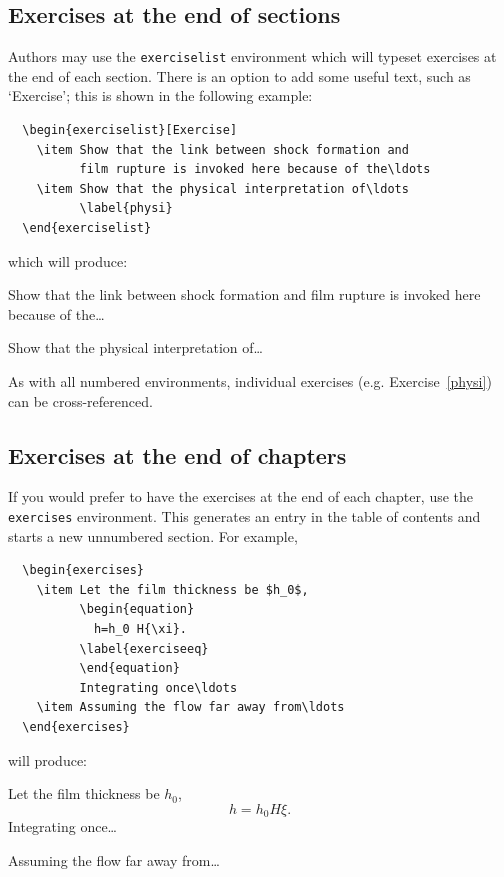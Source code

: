 \subsection{Exercises at the end of sections}
\label{exendofsections}

Authors may use the \verb"exerciselist" environment which will typeset exercises at the end of each section. There is an option to add some useful text, such as `Exercise'; this is shown in the following example:
\begin{verbatim}
  \begin{exerciselist}[Exercise]
    \item Show that the link between shock formation and
          film rupture is invoked here because of the\ldots
    \item Show that the physical interpretation of\ldots
          \label{physi}
  \end{exerciselist}
\end{verbatim}
which will produce:
  \begin{exerciselist}[Exercise]
    \item Show that the link between shock formation and
          film rupture is invoked here because of the\ldots
    \item Show that the physical interpretation of\ldots
          \label{physi}
  \end{exerciselist}
As with all numbered environments, individual exercises (e.g. Exercise~\ref{physi}) can be cross-referenced.

\subsection{Exercises at the end of chapters}

If you would prefer to have the exercises at the end of each chapter, use the \verb"exercises" environment. This generates an entry in the table of contents and starts a new unnumbered section. For example,
\begin{verbatim}
  \begin{exercises}
    \item Let the film thickness be $h_0$,
          \begin{equation}
            h=h_0 H{\xi}.
          \label{exerciseeq}
          \end{equation}
          Integrating once\ldots
    \item Assuming the flow far away from\ldots
  \end{exercises}
\end{verbatim}
will produce:
  \begin{exercises}
    \item Let the film thickness be $h_0$,
          \begin{equation}
            h=h_0 H{\xi}.
          \label{exerciseeq}
          \end{equation}
          Integrating once\ldots
    \item Assuming the flow far away from\ldots
  \end{exercises}


